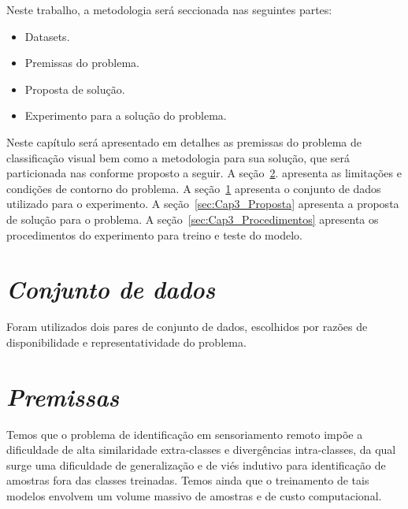 Neste trabalho, a metodologia será seccionada nas seguintes partes:
\begin{itemize}
    \item  Datasets.
    \item  Premissas do problema.
    \item  Proposta de solução.
    \item  Experimento para a solução do problema.

\end{itemize}

Neste capítulo será apresentado em detalhes as premissas do problema de classificação visual bem como a metodologia para sua solução, que será particionada nas conforme proposto a seguir. A seção~\ref{sec:Cap3_Premissas}. apresenta as limitações e condições de contorno do problema. A seção~\ref{sec:Cap3_Dataset} apresenta o conjunto de dados utilizado para o experimento. A seção~\ref{sec:Cap3_Proposta} apresenta a proposta de solução para o problema. A seção~\ref{sec:Cap3_Procedimentos} apresenta os procedimentos do experimento para treino e teste do modelo.


\section{\textit{Conjunto de dados}}\label{sec:Cap3_Dataset}
Foram utilizados dois pares de conjunto de dados, escolhidos por razões de disponibilidade e representatividade do problema. 




\section{\textit{Premissas}}\label{sec:Cap3_Premissas}

Temos que o problema de identificação em sensoriamento remoto impõe a dificuldade de alta similaridade extra-classes e divergências intra-classes, da qual surge uma dificuldade de generalização e de viés indutivo para identificação de amostras fora das classes treinadas. Temos ainda que o treinamento de tais modelos envolvem um volume massivo de amostras e de custo computacional. 



